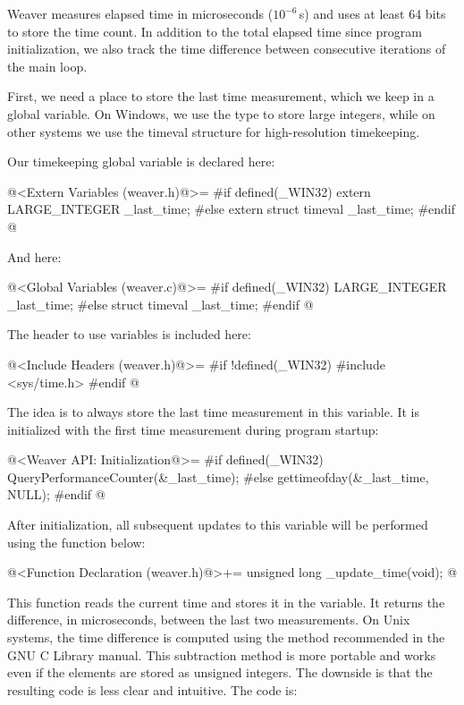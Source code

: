 
Weaver measures elapsed time in microseconds ($10^{-6}$ s) and uses at
least 64 bits to store the time count. In addition to the total
elapsed time since program initialization, we also track the time
difference between consecutive iterations of the main loop.

First, we need a place to store the last time measurement, which we
keep in a global variable. On Windows, we use
the  type to store large integers, while on
other systems we use the timeval structure for high-resolution
timekeeping.

Our timekeeping global variable is declared here:

\iniciocodigo
@<Extern Variables (weaver.h)@>=
#if defined(_WIN32)
extern LARGE_INTEGER _last_time;
#else
extern struct timeval _last_time;
#endif
@
\fimcodigo

And here:

\iniciocodigo
@<Global Variables (weaver.c)@>=
#if defined(_WIN32)
LARGE_INTEGER _last_time;
#else
struct timeval _last_time;
#endif
@
\fimcodigo

The header to use  variables is included
here:

\iniciocodigo
@<Include Headers (weaver.h)@>=
#if !defined(_WIN32)
#include <sys/time.h>
#endif
@
\fimcodigo

The idea is to always store the last time measurement in this
variable. It is initialized with the first time measurement during
program startup:

\iniciocodigo
@<Weaver API: Initialization@>=
#if defined(_WIN32)
QueryPerformanceCounter(&_last_time);
#else
gettimeofday(&_last_time, NULL);
#endif
@
\fimcodigo

After initialization, all subsequent updates to this variable will be
performed using the function below:

\iniciocodigo
@<Function Declaration (weaver.h)@>+=
unsigned long _update_time(void);
@
\fimcodigo

This function reads the current time and stores it in the variable. It
returns the difference, in microseconds, between the last two
measurements. On Unix systems, the time difference is computed using
the method recommended in the GNU C Library manual. This subtraction
method is more portable and works even if the 
elements are stored as unsigned integers. The downside is that the
resulting code is less clear and intuitive. The code is:

